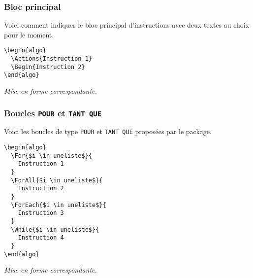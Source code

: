 \documentclass[12pt,a4paper]{article}
\theoremstyle{definition}
\newenvironment{frame-gene}[1][]{
	\begin{tcolorbox}[
		title        = #1, 
		colbacktitle = black!10!white, 
		colback      = white, 
		coltitle     = black,
		fonttitle    = \bfseries\itshape\small, 
		breakable,
		center title]
}{
	\end{tcolorbox}
}
\begin{document}
\subsubsection{Bloc principal}

Voici comment indiquer le bloc principal d'instructions avec deux textes au choix pour le moment.


\begin{multicols}{2}
    \centering
    \begin{frame-gene}
\begin{verbatim}
\begin{algo}
  \Actions{Instruction 1}
  \Begin{Instruction 2}
\end{algo}
\end{verbatim}
    \end{frame-gene}
    \vfill\null
    \columnbreak
    \textit{Mise en forme correspondante.}
\begin{algo}
\end{algo}
    \vfill\null
\end{multicols}


\subsubsection{Boucles \texttt{POUR} et \texttt{TANT QUE}}

Voici les boucles de type \verb+POUR+ et \verb+TANT QUE+ proposées par le package.

\newpage


\begin{multicols}{2}
    \centering
    \begin{frame-gene}
\begin{verbatim}
\begin{algo}
  \For{$i \in uneliste$}{
    Instruction 1
  }
  \ForAll{$i \in uneliste$}{
    Instruction 2
  }
  \ForEach{$i \in uneliste$}{
    Instruction 3
  }
  \While{$i \in uneliste$}{
    Instruction 4
  }
\end{algo}
\end{verbatim}
    \end{frame-gene}
    \vfill\null
    \columnbreak
    \textit{Mise en forme correspondante.}
\begin{algo}
\end{algo}
    \vfill\null
\end{multicols}
\end{document}
